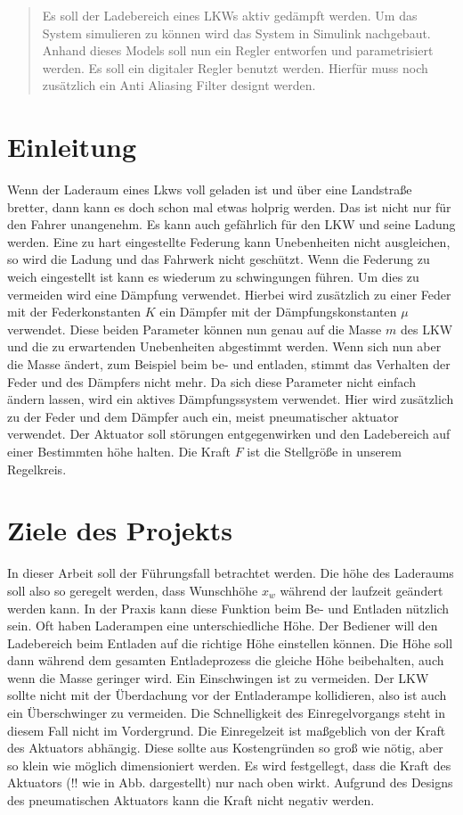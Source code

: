 	
	\begin{abstract} %
		Es soll der Ladebereich eines LKWs aktiv gedämpft werden. Um das System simulieren zu können wird das System in Simulink nachgebaut. Anhand dieses Models soll nun 
		ein Regler entworfen und parametrisiert werden. Es soll ein digitaler Regler benutzt werden. 
		Hierfür muss noch zusätzlich ein Anti Aliasing Filter designt werden.
	\end{abstract}
	
	\section{Einleitung}
	Wenn der Laderaum eines Lkws voll geladen ist und über eine Landstraße bretter, dann kann es doch schon mal etwas holprig werden. Das ist nicht nur für den Fahrer unangenehm. Es kann auch gefährlich für den LKW und seine Ladung werden.
	Eine zu hart eingestellte Federung kann Unebenheiten nicht ausgleichen, so wird die Ladung und das Fahrwerk nicht geschützt. Wenn die Federung zu weich eingestellt ist kann es 
	wiederum zu schwingungen führen. Um dies zu vermeiden wird eine Dämpfung verwendet. Hierbei wird zusätzlich zu einer Feder mit der Federkonstanten $K$ ein Dämpfer mit der Dämpfungskonstanten $\mu$ verwendet. 
	Diese beiden Parameter können nun genau auf die Masse $m$ des LKW und die zu erwartenden Unebenheiten abgestimmt werden. 
	Wenn sich nun aber die Masse ändert, zum Beispiel beim be- und entladen, stimmt das Verhalten der Feder und des Dämpfers nicht mehr.
	Da sich diese Parameter nicht einfach ändern lassen, wird ein aktives Dämpfungssystem verwendet. Hier wird zusätzlich zu der Feder und dem Dämpfer 
	auch ein, meist pneumatischer aktuator verwendet. Der Aktuator soll störungen entgegenwirken und den Ladebereich auf einer Bestimmten höhe halten.
	Die Kraft $F$ ist die Stellgröße in unserem Regelkreis.
		
	\section{Ziele des Projekts}
	In dieser Arbeit soll der Führungsfall betrachtet werden. Die höhe des Laderaums soll also so geregelt werden, dass Wunschhöhe $x_{w}$ während der laufzeit geändert werden kann.
	In der Praxis kann diese Funktion beim Be- und Entladen nützlich sein. Oft haben Laderampen eine unterschiedliche Höhe. Der Bediener will den Ladebereich
	beim Entladen auf die richtige Höhe einstellen können. Die Höhe soll dann während dem gesamten Entladeprozess die gleiche Höhe beibehalten, auch wenn die Masse geringer wird.
	Ein Einschwingen ist zu vermeiden. Der LKW sollte nicht mit der Überdachung vor der Entladerampe kollidieren, also ist auch ein Überschwinger zu vermeiden.
	Die Schnelligkeit des Einregelvorgangs steht in diesem Fall nicht im Vordergrund. Die Einregelzeit ist maßgeblich von der Kraft des Aktuators abhängig.
	Diese sollte aus Kostengründen so groß wie nötig, aber so klein wie möglich dimensioniert werden. 
	Es wird festgellegt, dass die Kraft des Aktuators (!! wie in Abb. dargestellt) nur nach oben wirkt. Aufgrund des Designs des pneumatischen Aktuators kann 
	die Kraft nicht negativ werden.

